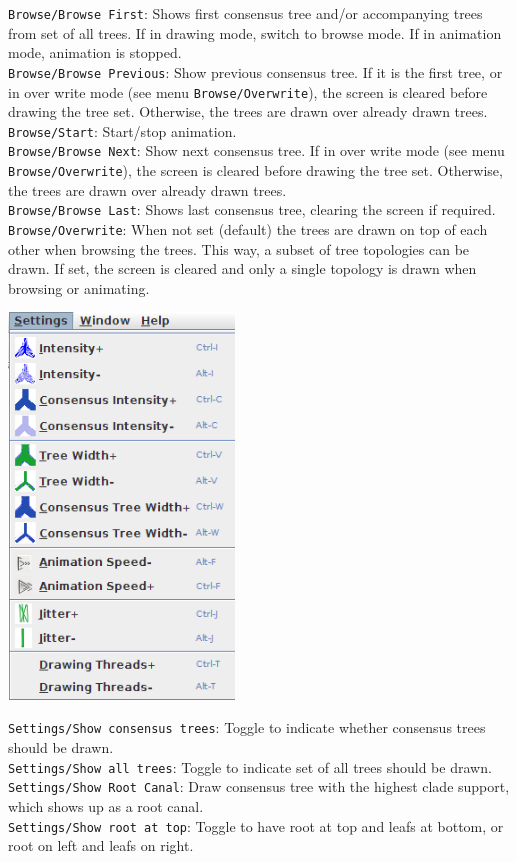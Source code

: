 \documentclass{article}
\begin{document}
\noindent
{\tt Browse/Browse First}: Shows first consensus tree and/or accompanying trees from set of
all trees. If in drawing mode, switch to browse mode. If in animation mode, animation is
stopped.\\
{\tt Browse/Browse Previous}: Show previous consensus tree. If it is the first tree,
or in over write mode (see menu {\tt Browse/Overwrite}), the screen is cleared before
drawing the tree set. Otherwise, the trees are drawn over already drawn trees.\\
{\tt Browse/Start}: Start/stop animation.\\
{\tt Browse/Browse Next}: Show next consensus tree. If in over write mode 
(see menu {\tt Browse/Overwrite}), the screen is cleared before drawing the tree set.
Otherwise, the trees are drawn over already drawn trees.\\
{\tt Browse/Browse Last}: Shows last consensus tree, clearing the screen if required.\\
{\tt Browse/Overwrite}: When not set (default) the trees are drawn on top of each other
when browsing the trees. This way, a subset of tree topologies can be drawn. 
If set, the screen is cleared and only a single topology is drawn when browsing or
animating.\\


\begin{center}
\includegraphics[width=6cm]{menusettings.png}
\end{center}

\noindent
{\tt Settings/Show consensus trees}: Toggle to indicate whether consensus trees 
should be drawn.\\
{\tt Settings/Show all trees}: Toggle to indicate set of all trees should be drawn.\\
{\tt Settings/Show Root Canal}: Draw consensus tree with the highest clade support, which shows
up as a root canal.\\
{\tt Settings/Show root at top}: Toggle to have root at top and leafs at bottom, or
root on left and leafs on right.\\
%
\end{document}
